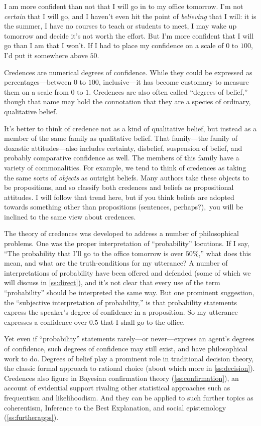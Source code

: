 I am more confident than not that I will go in to my office tomorrow. I'm not \emph{certain} that I will go, and I haven't even hit the point of \emph{believing} that I will: it is the summer, I have no courses to teach or students to meet, I may wake up tomorrow and decide it's not worth the effort. But I'm more confident that I will go than I am that I won't. If I had to place my confidence on a scale of $0$ to $100$, I'd put it somewhere above $50$.

Credences are numerical degrees of confidence. While they could be expressed as percentages---between $0$ to $100$, inclusive---it has become customary to measure them on a scale from $0$ to $1$. Credences are also often called ``degrees of belief,'' though that name may hold the connotation that they are a species of ordinary, qualitative belief.

It's better to think of credence not as a kind of qualitative belief, but instead as a member of the same family as qualitative belief. That family---the family of doxastic attitudes---also includes certainty, disbelief, suspension of belief, and probably comparative confidence as well. The members of this family have a variety of commonalities. For example, we tend to think of credences as taking the same sorts of \emph{objects} as outright beliefs. Many authors take these objects to be propositions, and so classify both credences and beliefs as propositional attitudes. I will follow that trend here, but if you think beliefs are adopted towards something other than propositions (sentences, perhaps?),\ you will be inclined to the same view about credences.

The theory of credences was developed to address a number of philosophical problems. One was the proper interpretation of ``probability'' locutions. If I say, ``The probability that I'll go to the office tomorrow is over $50\%$,'' what does this mean, and what are the truth-conditions for my utterance? A number of interpretations of probability have been offered and defended (some of which we will discuss in \autoref{ss:direct}), and it's not clear that every use of the term ``probability'' should be interpreted the same way. But one prominent suggestion, the ``subjective interpretation of probability,'' is that probability statements express the speaker's degree of confidence in a proposition. So my utterance expresses a confidence over $0.5$ that I shall go to the office.\label{titelbaum-interpretations}

Yet even if ``probability'' statements rarely---or never---express an agent's degrees of confidence, such degrees of confidence may still exist, and have philosophical work to do. Degrees of belief play a prominent role in traditional decision theory, the classic formal approach to rational choice (about which more in \autoref{ss:decision}). Credences also figure in Bayesian confirmation theory (\autoref{ss:confirmation}), an account of evidential support rivaling other statistical approaches such as frequentism and likelihoodism. And they can be applied to such further topics as coherentism, Inference to the Best Explanation, and social epistemology (\autoref{ss:furtherapps}).

